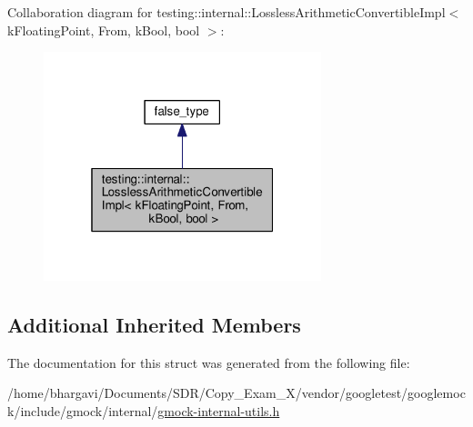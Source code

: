 Collaboration diagram for testing\+:\+:internal\+:\+:Lossless\+Arithmetic\+Convertible\+Impl$<$ k\+Floating\+Point, From, k\+Bool, bool $>$\+:
\nopagebreak
\begin{figure}[H]
\begin{center}
\leavevmode
\includegraphics[width=229pt]{structtesting_1_1internal_1_1_lossless_arithmetic_convertible_impl_3_01k_floating_point_00_01_fr47e600a9a6a1d0efa429d0f6c92fd5b2}
\end{center}
\end{figure}
\subsection*{Additional Inherited Members}


The documentation for this struct was generated from the following file\+:\begin{DoxyCompactItemize}
\item 
/home/bhargavi/\+Documents/\+S\+D\+R/\+Copy\+\_\+\+Exam\+\_\+X/vendor/googletest/googlemock/include/gmock/internal/\hyperlink{gmock-internal-utils_8h}{gmock-\/internal-\/utils.\+h}\end{DoxyCompactItemize}
